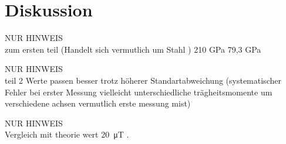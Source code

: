 
\section{Diskussion}
\label{sec:Diskussion}



NUR HINWEIS\\
zum ersten teil
(Handelt sich vermutlich um Stahl \cite[624\psq]{TaschenbuchPhysik}) 210 GPa
\cite{EinführungMechanik}  	79,3 GPa

NUR HINWEIS\\teil 2
Werte passen besser trotz höherer Standartabweichung (systematischer Fehler bei erster Messung vielleicht unterschiedliche trägheitsmomente um verschiedene achsen vermutlich erste messung mist)

NUR HINWEIS\\
Vergleich mit theorie wert \SI{20}{\micro\tesla} \cite{Erdmagnetfeld}.
	

